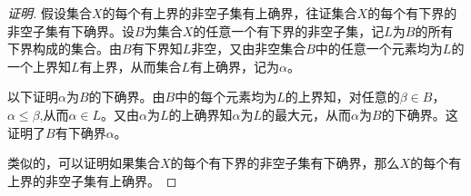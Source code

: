
\begin{proof}[证明]
  假设集合$X$的每个有上界的非空子集有上确界，往证集合$X$的每个有下界的非空子集有下确界。设$B$为集合$X$的任意一个有下界的非空子集，记$L$为$B$的所有下界构成的集合。由$B$有下界知$L$非空，又由非空集合$B$中的任意一个元素均为$L$的一个上界知$L$有上界，从而集合$L$有上确界，记为$\alpha$。

  以下证明$\alpha$为$B$的下确界。由$B$中的每个元素均为$L$的上界知，对任意的$\beta\in B$，$\alpha \leq \beta$,从而$\alpha \in L$。又由$\alpha$为$L$的上确界知$\alpha$为$L$的最大元，从而$\alpha$为$B$的下确界。这证明了$B$有下确界$\alpha$。

  类似的，可以证明如果集合$X$的每个有下界的非空子集有下确界，那么$X$的每个有上界的非空子集有上确界。
\end{proof}
